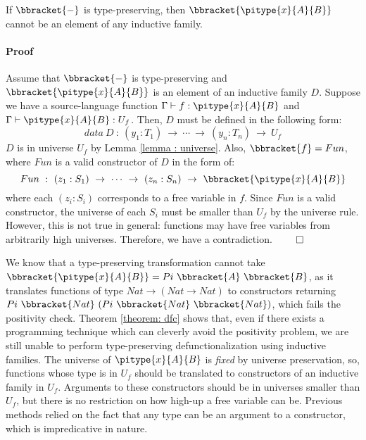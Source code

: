 \begin{theorem} If $\bbracket{-}$ is type-preserving, then $\bbracket{\pitype{x}{A}{B}}$ cannot be an element of any inductive family.
\paragraph{Proof} Assume that $\bbracket{-}$ is type-preserving and $\bbracket{\pitype{x}{A}{B}}$ is an element of an inductive family $D$. Suppose we have a source-language function $\Gamma \vdash f : \pitype{x}{A}{B}$ and $\Gamma \vdash \pitype{x}{A}{B} : U_f$. Then, $D$ must be defined in the following form:
\begin{equation*}
	data\ D\ :\ (y_1 : T_1)\ \rightarrow\ \cdots\ \rightarrow\ (y_n : T_n)\ \rightarrow\ U_f
\end{equation*}
$D$ is in universe $U_f$ by Lemma \ref{lemma : universe}. Also, $\bbracket{f} = Fun$, where $Fun$ is a valid constructor of $D$ in the form of:
\begin{equation*}
	Fun\ :\  (z_1 : S_1)\ \rightarrow\ \cdots\ \rightarrow\ (z_n : S_n)\ \rightarrow\ \bbracket{\pitype{x}{A}{B}}
\end{equation*}
where each $(z_i : S_i)$ corresponds to a free variable in $f$. Since $Fun$ is a valid constructor, the universe of each $S_i$ must be smaller than $U_f$ by the universe rule. However, this is not true in general: functions may have free variables from arbitrarily high universes. Therefore, we have a contradiction. $\qed$
\label{theorem: dfc}
\end{theorem}

We know that a type-preserving transformation cannot take $\bbracket{\pitype{x}{A}{B}} = Pi\ \bbracket{A}\ \bbracket{B}$, as it translates functions of type $Nat \rightarrow (Nat \rightarrow Nat)$ to constructors returning $Pi\ \bbracket{Nat}\ (Pi\ \bbracket{Nat}\ \bbracket{Nat})$, which fails the positivity check. Theorem \ref{theorem: dfc} shows that, even if there exists a programming technique which can cleverly avoid the positivity problem, we are still unable to perform type-preserving defunctionalization using inductive families. The universe of $\pitype{x}{A}{B}$ is \textit{fixed} by universe preservation, so, functions whose type is in $U_f$ should be translated to constructors of an inductive family in $U_f$. Arguments to these constructors should be in universes smaller than $U_f$, but there is no restriction on how high-up a free variable can be. Previous methods relied on the fact that any type can be an argument to a constructor, which is impredicative in nature.



